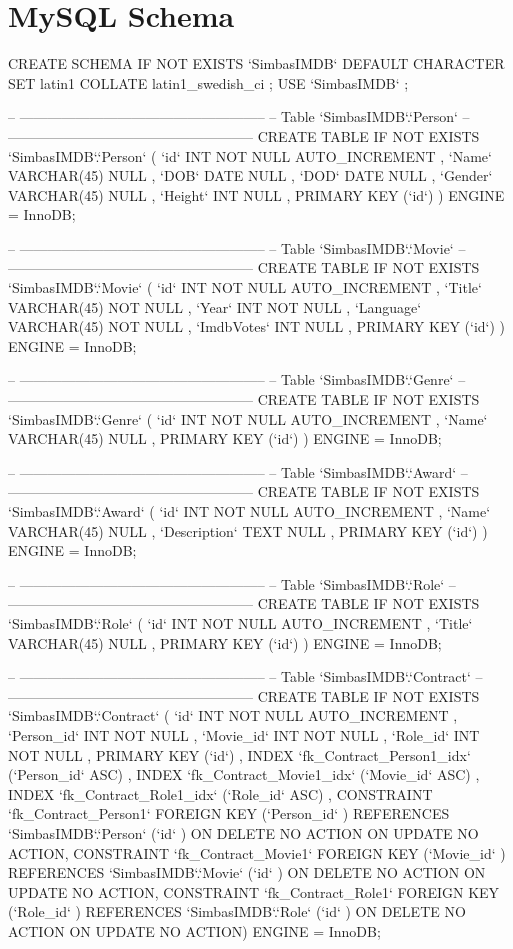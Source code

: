 \section{MySQL Schema}
\begin{spverbatim}
CREATE SCHEMA IF NOT EXISTS `SimbasIMDB` DEFAULT CHARACTER SET latin1 COLLATE latin1_swedish_ci ;
USE `SimbasIMDB` ;

-- -----------------------------------------------------
-- Table `SimbasIMDB`.`Person`
-- -----------------------------------------------------
CREATE  TABLE IF NOT EXISTS `SimbasIMDB`.`Person` (
  `id` INT NOT NULL AUTO_INCREMENT ,
  `Name` VARCHAR(45) NULL ,
  `DOB` DATE NULL ,
  `DOD` DATE NULL ,
  `Gender` VARCHAR(45) NULL ,
  `Height` INT NULL ,
  PRIMARY KEY (`id`) )
ENGINE = InnoDB;


-- -----------------------------------------------------
-- Table `SimbasIMDB`.`Movie`
-- -----------------------------------------------------
CREATE  TABLE IF NOT EXISTS `SimbasIMDB`.`Movie` (
  `id` INT NOT NULL AUTO_INCREMENT ,
  `Title` VARCHAR(45) NOT NULL ,
  `Year` INT NOT NULL ,
  `Language` VARCHAR(45) NOT NULL ,
  `ImdbVotes` INT NULL ,
  PRIMARY KEY (`id`) )
ENGINE = InnoDB;


-- -----------------------------------------------------
-- Table `SimbasIMDB`.`Genre`
-- -----------------------------------------------------
CREATE  TABLE IF NOT EXISTS `SimbasIMDB`.`Genre` (
  `id` INT NOT NULL AUTO_INCREMENT ,
  `Name` VARCHAR(45) NULL ,
  PRIMARY KEY (`id`) )
ENGINE = InnoDB;


-- -----------------------------------------------------
-- Table `SimbasIMDB`.`Award`
-- -----------------------------------------------------
CREATE  TABLE IF NOT EXISTS `SimbasIMDB`.`Award` (
  `id` INT NOT NULL AUTO_INCREMENT ,
  `Name` VARCHAR(45) NULL ,
  `Description` TEXT NULL ,
  PRIMARY KEY (`id`) )
ENGINE = InnoDB;


-- -----------------------------------------------------
-- Table `SimbasIMDB`.`Role`
-- -----------------------------------------------------
CREATE  TABLE IF NOT EXISTS `SimbasIMDB`.`Role` (
  `id` INT NOT NULL AUTO_INCREMENT ,
  `Title` VARCHAR(45) NULL ,
  PRIMARY KEY (`id`) )
ENGINE = InnoDB;


-- -----------------------------------------------------
-- Table `SimbasIMDB`.`Contract`
-- -----------------------------------------------------
CREATE  TABLE IF NOT EXISTS `SimbasIMDB`.`Contract` (
  `id` INT NOT NULL AUTO_INCREMENT ,
  `Person_id` INT NOT NULL ,
  `Movie_id` INT NOT NULL ,
  `Role_id` INT NOT NULL ,
  PRIMARY KEY (`id`) ,
  INDEX `fk_Contract_Person1_idx` (`Person_id` ASC) ,
  INDEX `fk_Contract_Movie1_idx` (`Movie_id` ASC) ,
  INDEX `fk_Contract_Role1_idx` (`Role_id` ASC) ,
  CONSTRAINT `fk_Contract_Person1`
    FOREIGN KEY (`Person_id` )
    REFERENCES `SimbasIMDB`.`Person` (`id` )
    ON DELETE NO ACTION
    ON UPDATE NO ACTION,
  CONSTRAINT `fk_Contract_Movie1`
    FOREIGN KEY (`Movie_id` )
    REFERENCES `SimbasIMDB`.`Movie` (`id` )
    ON DELETE NO ACTION
    ON UPDATE NO ACTION,
  CONSTRAINT `fk_Contract_Role1`
    FOREIGN KEY (`Role_id` )
    REFERENCES `SimbasIMDB`.`Role` (`id` )
    ON DELETE NO ACTION
    ON UPDATE NO ACTION)
ENGINE = InnoDB;



\end{spverbatim}
